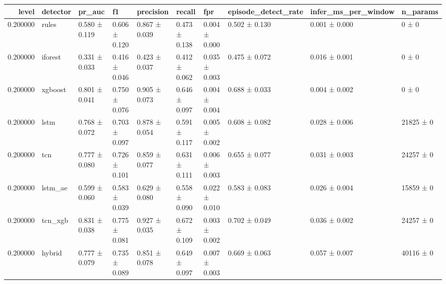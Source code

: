 \begin{tabular}{rlllllllll}
\toprule
level & detector & pr\_auc & f1 & precision & recall & fpr & episode\_detect\_rate & infer\_ms\_per\_window & n\_params \\
\midrule
0.200000 & rules & 0.580 ± 0.119 & 0.606 ± 0.120 & 0.867 ± 0.039 & 0.473 ± 0.138 & 0.004 ± 0.000 & 0.502 ± 0.130 & 0.001 ± 0.000 & 0 ± 0 \\
0.200000 & iforest & 0.331 ± 0.033 & 0.416 ± 0.046 & 0.423 ± 0.037 & 0.412 ± 0.062 & 0.035 ± 0.003 & 0.475 ± 0.072 & 0.016 ± 0.001 & 0 ± 0 \\
0.200000 & xgboost & 0.801 ± 0.041 & 0.750 ± 0.076 & 0.905 ± 0.073 & 0.646 ± 0.097 & 0.004 ± 0.004 & 0.688 ± 0.033 & 0.004 ± 0.002 & 0 ± 0 \\
0.200000 & lstm & 0.768 ± 0.072 & 0.703 ± 0.097 & 0.878 ± 0.054 & 0.591 ± 0.117 & 0.005 ± 0.002 & 0.608 ± 0.082 & 0.028 ± 0.006 & 21825 ± 0 \\
0.200000 & tcn & 0.777 ± 0.080 & 0.726 ± 0.101 & 0.859 ± 0.077 & 0.631 ± 0.111 & 0.006 ± 0.003 & 0.655 ± 0.077 & 0.031 ± 0.003 & 24257 ± 0 \\
0.200000 & lstm\_ae & 0.599 ± 0.060 & 0.583 ± 0.039 & 0.629 ± 0.080 & 0.558 ± 0.090 & 0.022 ± 0.010 & 0.583 ± 0.083 & 0.026 ± 0.004 & 15859 ± 0 \\
0.200000 & tcn\_xgb & 0.831 ± 0.038 & 0.775 ± 0.081 & 0.927 ± 0.035 & 0.672 ± 0.109 & 0.003 ± 0.002 & 0.702 ± 0.049 & 0.036 ± 0.002 & 24257 ± 0 \\
0.200000 & hybrid & 0.777 ± 0.079 & 0.735 ± 0.089 & 0.851 ± 0.078 & 0.649 ± 0.097 & 0.007 ± 0.003 & 0.669 ± 0.063 & 0.057 ± 0.007 & 40116 ± 0 \\
\bottomrule
\end{tabular}
